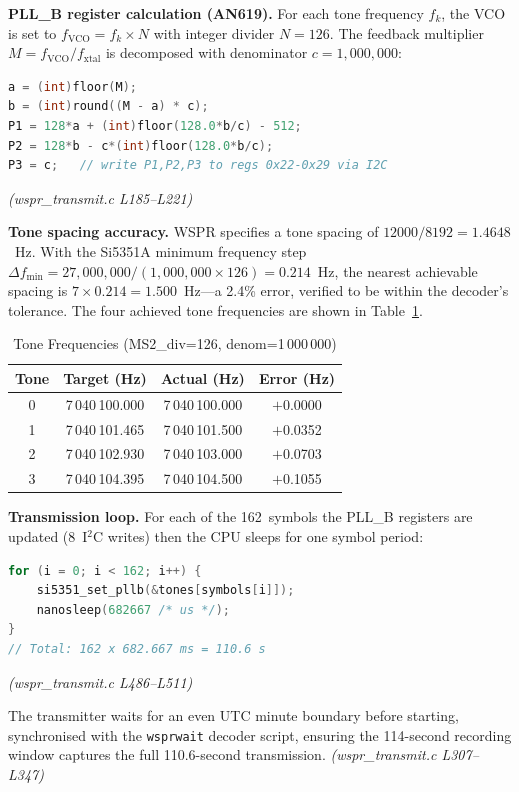 \documentclass[conference]{IEEEtran}
\begin{document}
\textbf{PLL\_B register calculation (AN619).} For each tone frequency $f_k$, the
VCO is set to $f_\text{VCO} = f_k \times N$ with integer divider $N=126$. The
feedback multiplier $M = f_\text{VCO}/f_\text{xtal}$ is decomposed with
denominator $c = 1{,}000{,}000$:
%
\begin{lstlisting}[style=cstyle,language=C]
a = (int)floor(M);
b = (int)round((M - a) * c);
P1 = 128*a + (int)floor(128.0*b/c) - 512;
P2 = 128*b - c*(int)floor(128.0*b/c);
P3 = c;   // write P1,P2,P3 to regs 0x22-0x29 via I2C
\end{lstlisting}
%
\textit{(wspr\_transmit.c L185--L221)}

\textbf{Tone spacing accuracy.} WSPR specifies a tone spacing of
$12000/8192 = 1.4648$~Hz. With the Si5351A minimum frequency step
$\Delta f_\text{min} = 27{,}000{,}000 / (1{,}000{,}000 \times 126) = 0.214$~Hz,
the nearest achievable spacing is $7 \times 0.214 = 1.500$~Hz---a 2.4\% error,
verified to be within the decoder's tolerance. The four achieved tone frequencies
are shown in Table~\ref{tab:tones}.

\begin{table}[t]
  \centering
  \caption{Tone Frequencies (MS2\_div=126, denom=1\,000\,000)}
  \label{tab:tones}
  \begin{tabular}{cccc}
    \toprule
    Tone & Target (Hz) & Actual (Hz) & Error (Hz) \\
    \midrule
    0 & 7\,040\,100.000 & 7\,040\,100.000 & $+$0.0000 \\
    1 & 7\,040\,101.465 & 7\,040\,101.500 & $+$0.0352 \\
    2 & 7\,040\,102.930 & 7\,040\,103.000 & $+$0.0703 \\
    3 & 7\,040\,104.395 & 7\,040\,104.500 & $+$0.1055 \\
    \bottomrule
  \end{tabular}
\end{table}

\textbf{Transmission loop.} For each of the 162~symbols the PLL\_B registers are
updated (8~I$^2$C writes) then the CPU sleeps for one symbol period:
%
\begin{lstlisting}[style=cstyle,language=C]
for (i = 0; i < 162; i++) {
    si5351_set_pllb(&tones[symbols[i]]);
    nanosleep(682667 /* us */);
}
// Total: 162 x 682.667 ms = 110.6 s
\end{lstlisting}
%
\textit{(wspr\_transmit.c L486--L511)}

The transmitter waits for an even UTC minute boundary before starting, synchronised
with the \texttt{wsprwait} decoder script, ensuring the 114-second recording window
captures the full 110.6-second transmission.
\textit{(wspr\_transmit.c L307--L347)}
\end{document}
